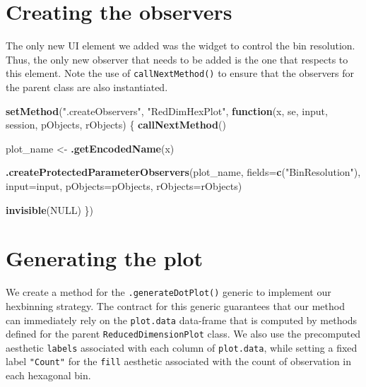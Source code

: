 \documentclass[
]{book}
\newenvironment{Shaded}{\begin{snugshade}}{\end{snugshade}}
\newcommand{\ControlFlowTok}[1]{\textcolor[rgb]{0.13,0.29,0.53}{\textbf{#1}}}
\newcommand{\DataTypeTok}[1]{\textcolor[rgb]{0.13,0.29,0.53}{#1}}
\newcommand{\KeywordTok}[1]{\textcolor[rgb]{0.13,0.29,0.53}{\textbf{#1}}}
\newcommand{\NormalTok}[1]{#1}
\newcommand{\OtherTok}[1]{\textcolor[rgb]{0.56,0.35,0.01}{#1}}
\newcommand{\StringTok}[1]{\textcolor[rgb]{0.31,0.60,0.02}{#1}}
\begin{document}
\hypertarget{creating-the-observers}{%
\section{Creating the observers}\label{creating-the-observers}}

The only new UI element we added was the widget to control the bin resolution.
Thus, the only new observer that needs to be added is the one that respects to this element.
Note the use of \texttt{callNextMethod()} to ensure that the observers for the parent class are also instantiated.

\begin{Shaded}
\begin{Highlighting}[]
\KeywordTok{setMethod}\NormalTok{(}\StringTok{".createObservers"}\NormalTok{, }\StringTok{"RedDimHexPlot"}\NormalTok{, }\ControlFlowTok{function}\NormalTok{(x, se, input, session, pObjects, rObjects) \{}
    \KeywordTok{callNextMethod}\NormalTok{()}

\NormalTok{    plot_name <-}\StringTok{ }\KeywordTok{.getEncodedName}\NormalTok{(x)}

    \KeywordTok{.createProtectedParameterObservers}\NormalTok{(plot_name,}
        \DataTypeTok{fields=}\KeywordTok{c}\NormalTok{(}\StringTok{"BinResolution"}\NormalTok{),}
        \DataTypeTok{input=}\NormalTok{input, }\DataTypeTok{pObjects=}\NormalTok{pObjects, }\DataTypeTok{rObjects=}\NormalTok{rObjects)}

    \KeywordTok{invisible}\NormalTok{(}\OtherTok{NULL}\NormalTok{)}
\NormalTok{\})}
\end{Highlighting}
\end{Shaded}

\hypertarget{generating-the-plot}{%
\section{Generating the plot}\label{generating-the-plot}}

We create a method for the \texttt{.generateDotPlot()} generic to implement our hexbinning strategy.
The contract for this generic guarantees that our method can immediately rely on the \texttt{plot.data} data-frame that is computed by methods defined for the parent \texttt{ReducedDimensionPlot} class.
We also use the precomputed aesthetic \texttt{labels} associated with each column of \texttt{plot.data}, while setting a fixed label \texttt{"Count"} for the \texttt{fill} aesthetic associated with the count of observation in each hexagonal bin.
\end{document}
